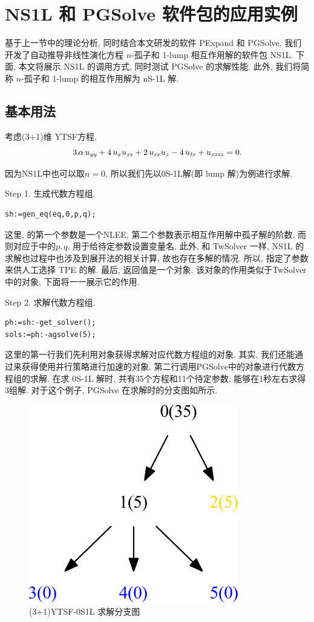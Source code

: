 \section{NS1L 和 PGSolve 软件包的应用实例}
基于上一节中的理论分析, 同时结合本文研发的软件 PExpand 和 PGSolve, 我们开发了自动推导非线性演化方程 $n$-孤子和 1-lump 相互作用解的软件包 NS1L. 下面, 本文将展示 NS1L 的调用方式, 同时测试 PGSolve 的求解性能. 此外, 我们将简称 $n$-孤子和 1-lump 的相互作用解为 nS-1L 解. 

\subsection{基本用法}
考虑(3+1)维 YTSF方程\CITEcaYTSF,
\begin{equation}
    3\,\alpha\,u_{{{\it yy}}}+4\,u_{{x}}u_{{{\it xz}}}+2\,u_{{{\it xx}}}u_{{z}}-4\,u_{{{\it tx}}}+u_{{{\it xxxz}}}=0. 
\end{equation}

因为NS1L中也可以取$n=0$, 所以我们先以0S-1L解(即 lump 解)为例进行求解. 

Step 1. 生成代数方程组.
\begin{verbatim}
sh:=gen_eq(eq,0,p,q);
\end{verbatim}
这里,  的第一个参数是一个NLEE, 第二个参数表示相互作用解中孤子解的阶数. 而则对应于中的$p,q$, 用于给待定参数设置变量名. 此外, 和 TwSolver 一样, NS1L 的求解也过程中也涉及到\Painleve{}展开法的相关计算, 故也存在多解的情况. 所以, 指定了参数来供人工选择 TPE 的解. 最后, 返回值是一个对象. 该对象的作用类似于TwSolver中的对象, 下面将一一展示它的作用. 

Step 2. 求解代数方程组.
\begin{verbatim}
ph:=sh:-get_solver();
sols:=ph:-agsolve(5);
\end{verbatim}
这里的第一行我们先利用对象获得求解对应代数方程组的对象. 其实, 我们还能通过来获得使用并行策略进行加速的对象. 第二行调用PGSolve中的对象进行代数方程组的求解. 在求 0S-1L 解时, 共有35个方程和11个待定参数, 能够在1秒左右求得3组解. 对于这个例子, PGSolve 在求解时的分支图如所示. 

\begin{figure}[htbp]
\centering
\includegraphics[width=.3\textwidth]{fig/0S1L.pdf}
\caption{(3+1)YTSF-0S1L 求解分支图}\label{sb0}
\end{figure}

